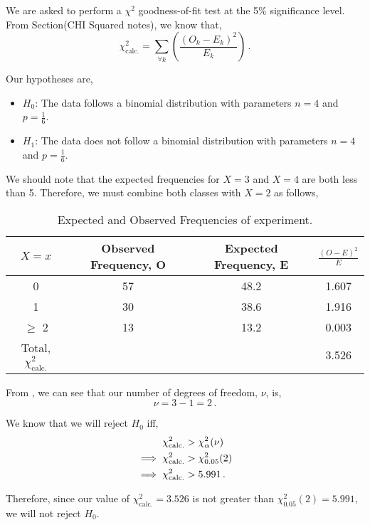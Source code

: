 \begin{subquestions}

\subquestion

We are asked to perform a $\chi^2$ goodness-of-fit test at the 5\% significance level. From Section(CHI Squared notes), we know that,
\begin{equation}
	\chi^2_\text{calc.} = \sum_{\forall k} \left(\frac{(O_k-E_k)^2}{E_k}  \right) \,.
\end{equation}

Our hypotheses are,
\begin{itemize}
	\item $H_0$: The data follows a binomial distribution with parameters $n=4$ and $p=\frac{1}{6}$. 
	\item $H_1$: The data does not follow a binomial distribution with parameters $n=4$ and $p=\frac{1}{6}$.
\end{itemize}

We should note that the expected frequencies for $X=3$ and $X=4$ are both less than 5. Therefore, we must combine both classes with $X=2$ as follows,
\begin{table}[H]
	\centering
	\begin{tabular}{|c|c|c|c|}
		\hline 
		$X=x$ & Observed Frequency, O & Expected Frequency, E & $\frac{(O-E)^2}{E}$ \\
		\hline
		0 & 57 & 48.2 & 1.607 \\
		1 & 30 & 38.6 & 1.916 \\
		$\geq$ 2 & 13 & 13.2 & 0.003 \\
		\hline
		Total, $\chi^2_\text{calc.}$ & & & 3.526 \\
		\hline
	\end{tabular}
	\caption{\label{2008M:q3:ChiTab} Expected and Observed Frequencies of experiment.}
\end{table}

From , we can see that our number of degrees of freedom, $\nu$, is,
\begin{equation}
	\nu = 3 - 1 = 2 \,.
\end{equation}

We know that we will reject $H_0$ iff,
\begin{align}
	\chi^2_\text{calc.} & > \chi^2_{\alpha}(\nu) \nonumber \\
	\implies \chi^2_\text{calc.} & > \chi^2_{0.05}(2) \nonumber \\
	\implies \chi^2_\text{calc.} & > 5.991 \,.
\end{align}

Therefore, since our value of $\chi^2_\text{calc.}=3.526$ is not greater than $\chi^2_{0.05}(2)=5.991$, we will not reject $H_0$.

\end{subquestions}
